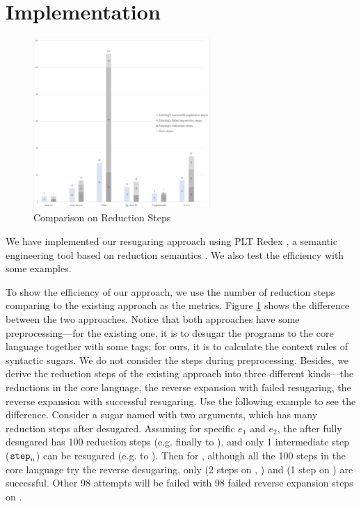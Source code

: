 \section{Implementation}
\label{sec:implementation}




\begin{figure}[thb]
	\centering
	\includegraphics[width=0.6\textwidth]{images/efficiency.png}
	\caption{Comparison on Reduction Steps}
	\label{fig:step}
\end{figure}
We have implemented our resugaring approach using PLT Redex \cite{SEwPR}, a semantic engineering tool based on reduction semantics \cite{reduction}. We also test the efficiency with some examples.

To show the efficiency of our approach, we use the number of reduction steps comparing to the existing approach as the metrics. Figure \ref{fig:step} shows the difference between the two approaches. Notice that both approaches have some preprocessing---for the existing one, it is to desugar the programs to the core language together with some tags; for ours, it is to calculate the context rules of syntactic sugars. We do not consider the steps during preprocessing. Besides, we derive the reduction steps of the existing approach into three different kinds---the reductions in the core language, the reverse expansion with failed resugaring, the reverse expansion with successful resugaring.  Use the following example to see the difference. Consider a sugar named  with two arguments, which has many reduction steps after desugared. Assuming for specific $e_1$ and $e_2$, the  after fully desugared has 100 reduction steps (e.g. finally to \m{\false}), and only 1 intermediate step ($\mbox{\tt step}_n$) can be resugared (e.g. to ). Then for , although all the 100 steps in the core language try the reverse desugaring, only  (2 steps on , ) and  (1 step on ) are successful. Other 98 attempts will be failed with 98 failed reverse expansion steps on .

